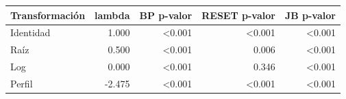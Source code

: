 \begin{tabular}{lrrrr}
\toprule
Transformación & lambda & BP p-valor & RESET p-valor & JB p-valor \\
\midrule
Identidad & 1.000 & <0.001 & <0.001 & <0.001 \\
Raíz & 0.500 & <0.001 & 0.006 & <0.001 \\
Log & 0.000 & <0.001 & 0.346 & <0.001 \\
Perfil & -2.475 & <0.001 & <0.001 & <0.001 \\
\bottomrule
\end{tabular}
